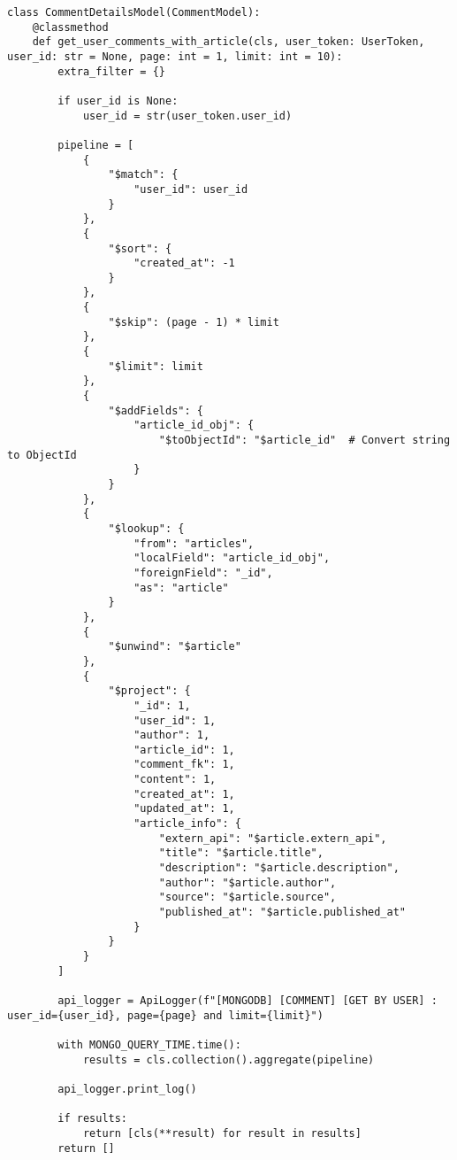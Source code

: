\begin{lstlisting}[style=pythonstyle,label={lst:pipeline-user-comments-with-article},caption={Pipeline User Comments with article}]
class CommentDetailsModel(CommentModel):
    @classmethod
    def get_user_comments_with_article(cls, user_token: UserToken, user_id: str = None, page: int = 1, limit: int = 10):
        extra_filter = {}

        if user_id is None:
            user_id = str(user_token.user_id)

        pipeline = [
            {
                "$match": {
                    "user_id": user_id
                }
            },
            {
                "$sort": {
                    "created_at": -1
                }
            },
            {
                "$skip": (page - 1) * limit
            },
            {
                "$limit": limit
            },
            {
                "$addFields": {
                    "article_id_obj": {
                        "$toObjectId": "$article_id"  # Convert string to ObjectId
                    }
                }
            },
            {
                "$lookup": {
                    "from": "articles",
                    "localField": "article_id_obj",
                    "foreignField": "_id",
                    "as": "article"
                }
            },
            {
                "$unwind": "$article"
            },
            {
                "$project": {
                    "_id": 1,
                    "user_id": 1,
                    "author": 1,
                    "article_id": 1,
                    "comment_fk": 1,
                    "content": 1,
                    "created_at": 1,
                    "updated_at": 1,
                    "article_info": {
                        "extern_api": "$article.extern_api",
                        "title": "$article.title",
                        "description": "$article.description",
                        "author": "$article.author",
                        "source": "$article.source",
                        "published_at": "$article.published_at"
                    }
                }
            }
        ]

        api_logger = ApiLogger(f"[MONGODB] [COMMENT] [GET BY USER] : user_id={user_id}, page={page} and limit={limit}")

        with MONGO_QUERY_TIME.time():
            results = cls.collection().aggregate(pipeline)

        api_logger.print_log()

        if results:
            return [cls(**result) for result in results]
        return []
\end{lstlisting}


